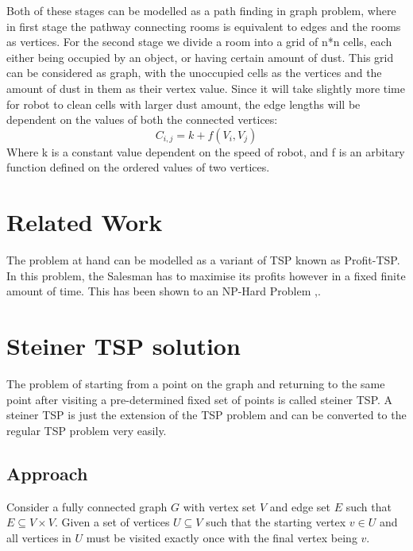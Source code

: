 \documentclass{article}
\begin{document}
Both of these stages can be modelled as a path finding in graph problem, where in first stage the pathway connecting rooms is equivalent to edges and the rooms as vertices.
For the second stage we divide a room into a grid of n*n cells, each either being occupied by an object, or having certain amount of dust. This grid can be considered as graph,
with the unoccupied cells as the vertices and the amount of dust in them as their vertex value. Since it will take slightly more time for robot to clean cells with larger dust amount,
the edge lengths will be dependent on the values of both the connected vertices:
\begin{equation}
    C_{i,j} = k + f(V_i,V_j)
\end{equation}
Where k is a constant value dependent on the speed of robot, and f is an arbitary function defined on the ordered values of two vertices.




\section{Related Work}

The problem at hand can be modelled as a variant of TSP  known as Profit-TSP. In this problem,
the Salesman has to maximise its profits however in a fixed finite amount of time. 
This has been shown to an NP-Hard Problem \cite{RAMESH1991151},\cite{apps2}. 


\section{Steiner TSP solution}

The problem of starting from a point on the graph and returning to the same point after visiting a pre-determined fixed
set of points is called steiner TSP. A steiner TSP is just the extension of the TSP problem and can be converted to the
regular TSP problem very easily.

\subsection{Approach}

Consider a fully connected graph $G$ with vertex set $V$ and edge set $E$ such that $E \subseteq V \times V$. 
Given a set of vertices $U \subseteq V$ such that the starting vertex $v \in U$ and all vertices in $U$ must be visited
exactly once with the final vertex being $v$.
\end{document}
